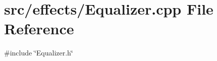 \section{src/effects/\+Equalizer.cpp File Reference}
\label{_equalizer_8cpp}
{\ttfamily \#include \char`\"{}Equalizer.\+h\char`\"{}}\newline

